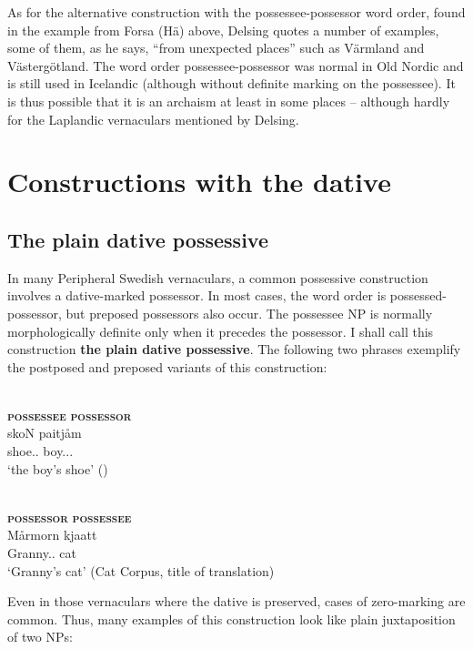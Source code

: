 As for the alternative construction with the possessee-possessor word order, found in the example from Forsa (Hä) above, Delsing quotes a number of examples, some of them, as he says, “from unexpected places” such as Värmland and Västergötland. The word order possessee-possessor was normal in Old Nordic and is still used in Icelandic (although without definite marking on the possessee). It is thus possible that it is an archaism at least in some places – although hardly for the Laplandic vernaculars mentioned by Delsing.

\section{Constructions with the dative}
\label{sec:5.4}\subsection{The plain dative possessive}\label{sec:5.4.1}

In many Peripheral Swedish vernaculars, a common possessive construction involves a dative-marked possessor. In most cases, the word order is possessed-possessor, but preposed possessors also occur. The possessee NP is normally morphologically definite only when it precedes the possessor. I shall call this construction \textbf{the plain dative possessive}. The following two phrases exemplify the postposed and preposed variants of this construction:

\renewcommand{\eachwordone}{\scshape}
\renewcommand{\eachwordtwo}{\itshape}

\ea%
	\\
	\glll \textbf{\textsc{possessee}} \textbf{\textsc{possessor}} \\
	skoN  paitjåm  \\
	shoe.{\sg}.{}  boy.{\dat}.{\sg}.{}  \\
	\glt ‘the boy’s shoe’ (\citealt[22]{Marklund1976})
\z

\ea%
	\\
	\glll \textbf{\textsc{possessor}} \textbf{\textsc{possessee}} \\
	Mårmorn  kjaatt\\
	Granny.{}.{\dat}  cat\\
\glt ‘Granny’s cat’ (Cat Corpus, title of translation)
\z

Even in those vernaculars where the dative is preserved, cases of zero-marking are common. Thus, many examples of this construction look like plain juxtaposition of two NPs:

